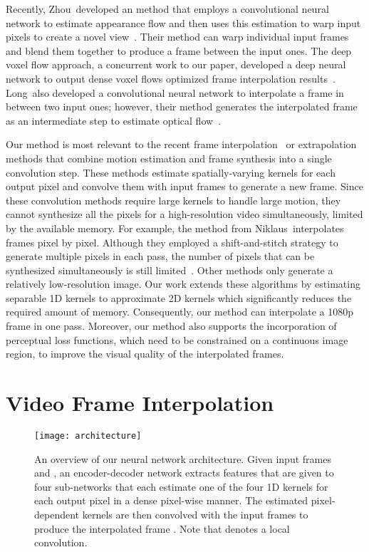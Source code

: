 \documentclass[10pt,twocolumn,letterpaper]{article}
\begin{document}
Recently, Zhou~\etal developed an method that employs a convolutional neural network to estimate appearance flow and then uses this estimation to warp input pixels to create a novel view~\cite{Zhou_ECCV_2016}. Their method can warp individual input frames and blend them together to produce a frame between the input ones. The deep voxel flow approach, a concurrent work to our paper, developed a deep neural network to output dense voxel flows optimized frame interpolation results~\cite{Liu_CORR_2017}. Long~\etal also developed a convolutional neural network to interpolate a frame in between two input ones; however, their method generates the interpolated frame as an intermediate step to estimate optical flow~\cite{Long_ECCV_2016}.

Our method is most relevant to the recent frame interpolation~\cite{Niklaus_CVPR_2017} or extrapolation~\cite{Finn_NIPS_2016, Jia_NIPS_2016, Xue_NIPS_2016} methods that combine motion estimation and frame synthesis into a single convolution step. These methods estimate spatially-varying kernels for each output pixel and convolve them with input frames to generate a new frame. Since these convolution methods require large kernels to handle large motion, they cannot synthesize all the pixels for a high-resolution video simultaneously, limited by the available memory. For example, the method from Niklaus~\etal interpolates frames pixel by pixel. Although they employed a shift-and-stitch strategy to generate multiple pixels in each pass, the number of pixels that can be synthesized simultaneously is still limited~\cite{Niklaus_CVPR_2017}. Other methods only generate a relatively low-resolution image. Our work extends these algorithms by estimating separable 1D kernels to approximate 2D kernels which significantly reduces the required amount of memory. Consequently, our method can interpolate a 1080p frame in one pass. Moreover, our method also supports the incorporation of perceptual loss functions, which need to be constrained on a continuous image region, to improve the visual quality of the interpolated frames. 
\section{Video Frame Interpolation}
\label{sec:method}
\begin{figure*}\centering
    \hspace*{-0.3cm}\texttt{[image: architecture]}\vspace{-0.2cm}
	\caption{An overview of our neural network architecture. Given input frames  and , an encoder-decoder network extracts features that are given to four sub-networks that each estimate one of the four 1D kernels for each output pixel in a dense pixel-wise manner. The estimated pixel-dependent kernels are then convolved with the input frames to produce the interpolated frame . Note that  denotes a local convolution.}\vspace{-0.2in}
	\label{fig:architecture}
\end{figure*}
\end{document}
